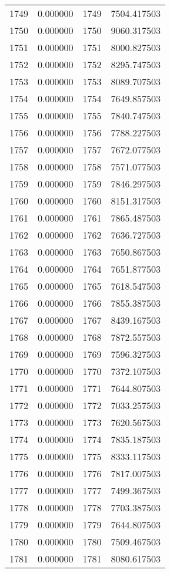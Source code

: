 \documentclass[12pt]{article}
\begin{document}
\begin{longtable}{@{}cccc@{}}
1749 & 0.000000 & 1749 & 7504.417503 \\
1750 & 0.000000 & 1750 & 9060.317503 \\
1751 & 0.000000 & 1751 & 8000.827503 \\
1752 & 0.000000 & 1752 & 8295.747503 \\
1753 & 0.000000 & 1753 & 8089.707503 \\
1754 & 0.000000 & 1754 & 7649.857503 \\
1755 & 0.000000 & 1755 & 7840.747503 \\
1756 & 0.000000 & 1756 & 7788.227503 \\
1757 & 0.000000 & 1757 & 7672.077503 \\
1758 & 0.000000 & 1758 & 7571.077503 \\
1759 & 0.000000 & 1759 & 7846.297503 \\
1760 & 0.000000 & 1760 & 8151.317503 \\
1761 & 0.000000 & 1761 & 7865.487503 \\
1762 & 0.000000 & 1762 & 7636.727503 \\
1763 & 0.000000 & 1763 & 7650.867503 \\
1764 & 0.000000 & 1764 & 7651.877503 \\
1765 & 0.000000 & 1765 & 7618.547503 \\
1766 & 0.000000 & 1766 & 7855.387503 \\
1767 & 0.000000 & 1767 & 8439.167503 \\
1768 & 0.000000 & 1768 & 7872.557503 \\
1769 & 0.000000 & 1769 & 7596.327503 \\
1770 & 0.000000 & 1770 & 7372.107503 \\
1771 & 0.000000 & 1771 & 7644.807503 \\
1772 & 0.000000 & 1772 & 7033.257503 \\
1773 & 0.000000 & 1773 & 7620.567503 \\
1774 & 0.000000 & 1774 & 7835.187503 \\
1775 & 0.000000 & 1775 & 8333.117503 \\
1776 & 0.000000 & 1776 & 7817.007503 \\
1777 & 0.000000 & 1777 & 7499.367503 \\
1778 & 0.000000 & 1778 & 7703.387503 \\
1779 & 0.000000 & 1779 & 7644.807503 \\
1780 & 0.000000 & 1780 & 7509.467503 \\
1781 & 0.000000 & 1781 & 8080.617503 \\

\end{longtable}
\end{document}
